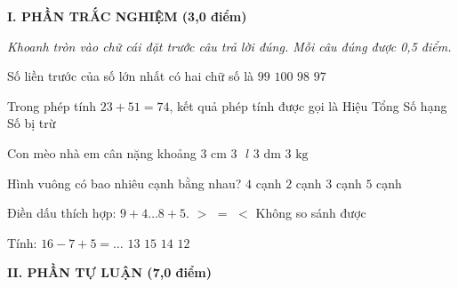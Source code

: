 
\setcounter{ex}{0}
\setcounter{bt}{0}

\textbf{\large I. PHẦN TRẮC NGHIỆM (3,0 điểm)}

{\itshape Khoanh tròn vào chữ cái đặt trước câu trả lời đúng. Mỗi câu đúng được 0,5 điểm.}

\begin{ex} %
Số liền trước của số lớn nhất có hai chữ số là
\choice
{$99$}
{$100$}
{\True $98$}
{$97$}
\end{ex}

\begin{ex} %
Trong phép tính $23 + 51 = 74$, kết quả phép tính được gọi là
\choice
{Hiệu}
{\True Tổng}
{Số hạng}
{Số bị trừ}
\end{ex}

\begin{ex} %
Con mèo nhà em cân nặng khoảng
\choice
{$3\text{ cm}$}
{$3\text{ }l$}
{$3\text{ dm}$}
{\True $3\text{ kg}$}
\end{ex}

\begin{ex} %
Hình vuông có bao nhiêu cạnh bằng nhau?
\choice
{\True $4$ cạnh}
{$2$ cạnh}
{$3$ cạnh}
{$5$ cạnh}
\end{ex}

\begin{ex} %
Điền dấu thích hợp: $9 + 4 \dots 8 + 5$.
\choice
{$>$}
{\True $=$}
{$<$}
{Không so sánh được}
\end{ex}

\begin{ex} %
Tính: $16 - 7 + 5 = \dots$
\choice
{$13$}
{$15$}
{\True $14$}
{$12$}
\end{ex}

\vspace{4mm}
\textbf{\large II. PHẦN TỰ LUẬN (7,0 điểm)}

